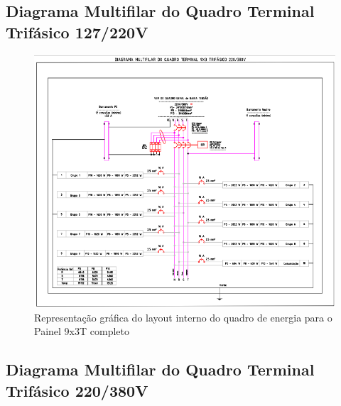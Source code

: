 \subsection{Diagrama Multifilar do Quadro Terminal Trifásico 127/220V} 

\begin{figure}[h]
    \centering
    \includegraphics[width=\textwidth]{image/multi9x3t220.png}
    \caption{Representação gráfica do layout interno do quadro de energia para o Painel 9x3T completo}
   \label{fig:QDTmult9x3t220}
\end{figure}

\subsection{Diagrama Multifilar do Quadro Terminal Trifásico 220/380V} 

